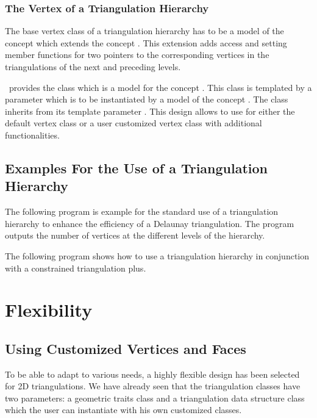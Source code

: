 \subsubsection{The Vertex of a Triangulation Hierarchy}
The base vertex class  of a triangulation hierarchy 
has to be a model of the
concept
 which extends
the concept .
This extension adds
access and setting member functions 
for two pointers  to the corresponding vertices in the 
triangulations of the next and preceding levels.

\cgal\ provides the class 
which is a model for the concept 
.
This class is templated by a parameter 
which is to be instantiated by a model of  the concept
.
The class  inherits
from its template parameter .
This design allows to use for   
either the default
vertex class or a user customized
vertex class with additional functionalities.

\subsection{Examples For the Use of a  Triangulation Hierarchy\label{Subsection_2D_Triangulations_Hierarchy_Examples}}

The following program is example
for the  standard use of a  triangulation hierarchy
to enhance the efficiency
of a Delaunay triangulation. The program outputs the number of vertices
at the different levels of the hierarchy.

The following program shows how to use
a triangulation hierarchy in conjunction with a constrained 
triangulation plus.

\section{Flexibility \label{Section_2D_Triangulations_Flexibility}}

\subsection{Using Customized Vertices and Faces}

To be able to adapt to  various needs, a highly
flexible design has been  selected for 2D triangulations.
We have already seen that
the triangulation classes have two
parameters: a geometric traits class
and a triangulation data structure  class
which the user can instantiate with his own customized classes.

